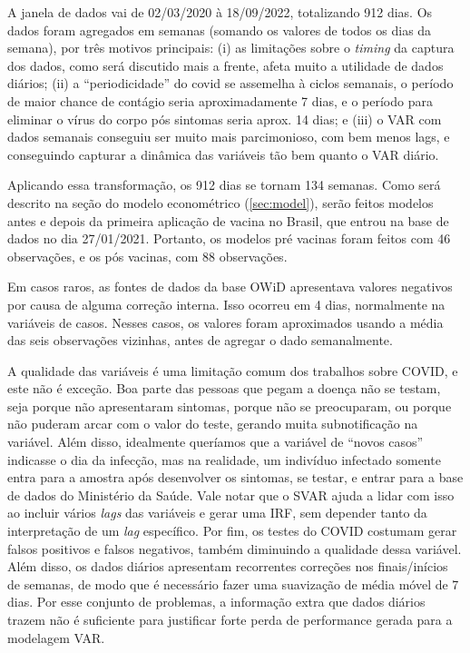 \documentclass[
	12pt,				%
	oneside,			%
	a4paper,			%
	english,			%
	brazil				%
	hyperref = {colorlinks, citecolor=c1d, linkcolor=c2d, urlcolor=c3d, colorlinks}
	]{abntex2}
\newcounter{j}
\begin{document}
A janela de dados vai de 02/03/2020 à 18/09/2022, totalizando 912 dias. Os dados foram agregados em semanas (somando os valores de todos os dias da semana), por três motivos principais: (i) as limitações sobre o \textit{timing} da captura dos dados, como será discutido mais a frente, afeta muito a utilidade de dados diários; (ii) a ``periodicidade'' do covid se assemelha à ciclos semanais, o período de maior chance de contágio seria aproximadamente 7 dias, e o período para eliminar o vírus do corpo pós sintomas seria aprox. 14 dias; e (iii) o VAR com dados semanais conseguiu ser muito mais parcimonioso, com bem menos lags, e conseguindo capturar a dinâmica das variáveis tão bem quanto o VAR diário.

Aplicando essa transformação, os 912 dias se tornam 134 semanas. Como será descrito na seção do modelo econométrico (\ref{sec:model}), serão feitos modelos antes e depois da primeira aplicação de vacina no Brasil, que entrou na base de dados no dia 27/01/2021. Portanto, os modelos pré vacinas foram feitos com 46 observações, e os pós vacinas, com 88 observações.

Em casos raros, as fontes de dados da base OWiD apresentava valores negativos por causa de alguma correção interna. Isso ocorreu em 4 dias, normalmente na variáveis de casos. Nesses casos, os valores foram aproximados usando a média das seis observações vizinhas, antes de agregar o dado semanalmente.

A qualidade das variáveis é uma limitação comum dos trabalhos sobre COVID, e este não é exceção. Boa parte das pessoas que pegam a doença não se testam, seja porque não apresentaram sintomas, porque não se preocuparam, ou porque não puderam arcar com o valor do teste, gerando muita subnotificação na variável. Além disso, idealmente queríamos que a variável de ``novos casos'' indicasse o dia da infecção, mas na realidade, um indivíduo infectado somente entra para a amostra após desenvolver os sintomas, se testar, e entrar para a base de dados do Ministério da Saúde. Vale notar que o SVAR ajuda a lidar com isso ao incluir vários \textit{lags} das variáveis e gerar uma IRF, sem depender tanto da interpretação de um \textit{lag} específico. Por fim, os testes do COVID costumam gerar falsos positivos e falsos negativos, também diminuindo a qualidade dessa variável. Além disso, os dados diários apresentam recorrentes correções nos finais/inícios de semanas, de modo que é necessário fazer uma suavização de média móvel de 7 dias. Por esse conjunto de problemas, a informação extra que dados diários trazem não é suficiente para justificar forte perda de performance gerada para a modelagem VAR.
\end{document}

